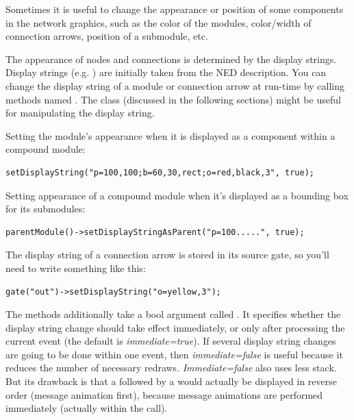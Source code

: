 Sometimes it is useful to change the appearance or position of
some components in the network graphics, such as the color of the
modules, color/width of connection arrows,
position of a submodule, etc.

The appearance of nodes and connections is determined by the display
strings. Display strings (e.g. )
are initially taken from the NED description.
You can change the display string of a module or connection arrow
at run-time by calling methods named .
The  class (discussed in the following sections)
might be useful for manipulating the display string.

Setting the module's appearance when it is displayed as a component
within a compound module:

\begin{verbatim}
setDisplayString("p=100,100;b=60,30,rect;o=red,black,3", true);
\end{verbatim}

Setting appearance of a compound module when it's displayed as a
bounding box for its submodules:

\begin{verbatim}
parentModule()->setDisplayStringAsParent("p=100.....", true);
\end{verbatim}

The display string of a connection arrow
is stored in its source gate, so you'll need to write something
like this:

\begin{verbatim}
gate("out")->setDisplayString("o=yellow,3");
\end{verbatim}

The  methods additionally take a bool
argument called . It specifies whether the display
string change should take effect immediately, or only after processing
the current event (the default is \textit{immediate=true}). If several
display string changes are going to be done within one event, then
\textit{immediate=false} is useful because it reduces the number of
necessary redraws. \textit{Immediate=false} also uses less stack.  But
its drawback is that a  followed by a
 would actually be displayed in reverse order (message
animation first), because message animations are performed immediately
(actually within the  call).


